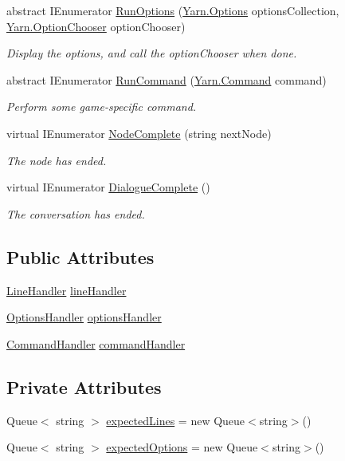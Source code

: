 \begin{DoxyCompactItemize}
abstract I\-Enumerator \hyperlink{a00097_ac5b29079f638f2ceb078627ef1e60004}{Run\-Options} (\hyperlink{a00053_a00383}{Yarn.\-Options} options\-Collection, \hyperlink{a00053_a39866cbb03c03a35805d598b5d4ad553}{Yarn.\-Option\-Chooser} option\-Chooser)
\begin{DoxyCompactList}\small\item\em Display the options, and call the option\-Chooser when done. \end{DoxyCompactList}\item 
abstract I\-Enumerator \hyperlink{a00097_a3dffe84b9e7a10fdec6749baf697d111}{Run\-Command} (\hyperlink{a00053_a00376}{Yarn.\-Command} command)
\begin{DoxyCompactList}\small\item\em Perform some game-\/specific command. \end{DoxyCompactList}\item 
virtual I\-Enumerator \hyperlink{a00097_a2900548a0704d39d4502a153945f4bef}{Node\-Complete} (string next\-Node)
\begin{DoxyCompactList}\small\item\em The node has ended. \end{DoxyCompactList}\item 
virtual I\-Enumerator \hyperlink{a00097_aecc60aee9e9386da1f71fb183f43c52d}{Dialogue\-Complete} ()
\begin{DoxyCompactList}\small\item\em The conversation has ended. \end{DoxyCompactList}\end{DoxyCompactItemize}
\subsection*{Public Attributes}
\begin{DoxyCompactItemize}
\item 
\hyperlink{a00173_ac6c30953edbd1cd4181e2a3854a1642b}{Line\-Handler} \hyperlink{a00173_af87332992e1420a8b2047822fab2b03c}{line\-Handler}
\item 
\hyperlink{a00173_a7fe2e6bc2d5471d9af14a9d35de821bd}{Options\-Handler} \hyperlink{a00173_adcbea72eb6f5ab305b3757789919f961}{options\-Handler}
\item 
\hyperlink{a00173_afc93c5cf370b31eceab3671c9eca0d94}{Command\-Handler} \hyperlink{a00173_a5c2003ece8aeab171db3a749bef5f770}{command\-Handler}
\end{DoxyCompactItemize}
\subsection*{Private Attributes}
\begin{DoxyCompactItemize}
\item 
Queue$<$ string $>$ \hyperlink{a00173_ab0f7b55e776ae494a651c845b496916c}{expected\-Lines} = new Queue$<$string$>$()
\item 
Queue$<$ string $>$ \hyperlink{a00173_a94e4308d412945c977b2deb63f139009}{expected\-Options} = new Queue$<$string$>$()
\end{DoxyCompactItemize}


